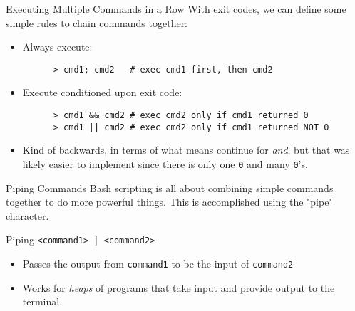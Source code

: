 \begin{frame}[fragile]{Executing Multiple Commands in a Row}
  With exit codes, we can define some simple rules to chain commands together:

  \begin{itemize}[<+- | alert@+>]
    \item Always execute:

    \begin{verbatim}
      > cmd1; cmd2   # exec cmd1 first, then cmd2
    \end{verbatim}

    \item Execute conditioned upon exit code:

    \begin{verbatim}
      > cmd1 && cmd2 # exec cmd2 only if cmd1 returned 0
      > cmd1 || cmd2 # exec cmd2 only if cmd1 returned NOT 0
    \end{verbatim}

    \item Kind of backwards, in terms of what means continue for \emph{and}, but that was likely easier to implement
          since there is only one \texttt{0} and many  \texttt{0}'s.
  \end{itemize}
\end{frame}

\begin{frame}[fragile]{Piping Commands}
  Bash scripting is all about combining simple commands together to do more powerful things.  This is accomplished
  using the "pipe" character.

  \begin{block}{Piping}
    \texttt{<command1> | <command2>}
    \begin{itemize}
      \item Passes the output from \texttt{command1} to be the input of \texttt{command2}
      \item Works for \emph{heaps} of programs that take input and provide output to the terminal.
    \end{itemize}
  \end{block}
\end{frame}

